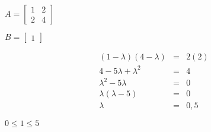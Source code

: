 \documentclass[letterpaper,12pt,fleqn]{article}
\renewcommand{\l}{\lambda}
\begin{document}
\begin{example}
  \begin{minipage}{1.5in}
    $A=\begin{bmatrix} 1 & 2 \\ 2 & 4 \end{bmatrix}$
  \end{minipage}
  \begin{minipage}{1in}
    $B=\begin{bmatrix} 1 \end{bmatrix}$
  \end{minipage}
  \begin{minipage}{2in}
    \begin{eqnarray*}
      (1-\l)(4-\l) &=& 2(2) \\
      4-5\l+\l^2 &=& 4 \\
      \l^2-5\l &=& 0 \\
      \l(\l-5) &=& 0 \\
      \l &=& 0,5
    \end{eqnarray*}
  \end{minipage}
  
  $0\le1\le5$
\end{example}
\end{document}
